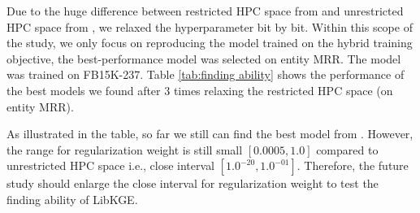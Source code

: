 \begin{table}[!htbp]
\centering
{}
\caption[Model performance when relaxing the restricted HPC space]{Model performance when relaxing the restricted HPC space. The \textit{Trial} indicates the id of trial, \textit{Hyperparameters} are the hyperparameters we attempted to relax with their corresponding values in the \textit{Value} column. Entity MRR indicates the MRR that the best model can achieve.}
\label{tab:finding ability}
\end{table}

Due to the huge difference between restricted HPC space from \cite{chen2021relation} and unrestricted HPC space from \cite{Ruffinelli2020You}, we relaxed the hyperparameter bit by bit. Within this scope of the study, we only focus on reproducing the model trained on the hybrid training objective, the best-performance model was selected on entity MRR. The model was trained on FB15K-237. Table \ref{tab:finding ability} shows the performance of the best models we found after 3 times relaxing the restricted HPC space (on entity MRR). 

As illustrated in the table, so far we still can find the best model from \cite{chen2021relation}. However, the range for regularization weight is still small $[0.0005, 1.0]$ compared to unrestricted HPC space i.e., close interval $[1.0^{-20}, 1.0^{-01}]$. Therefore, the future study should enlarge the close interval for regularization weight to test the finding ability of LibKGE.
